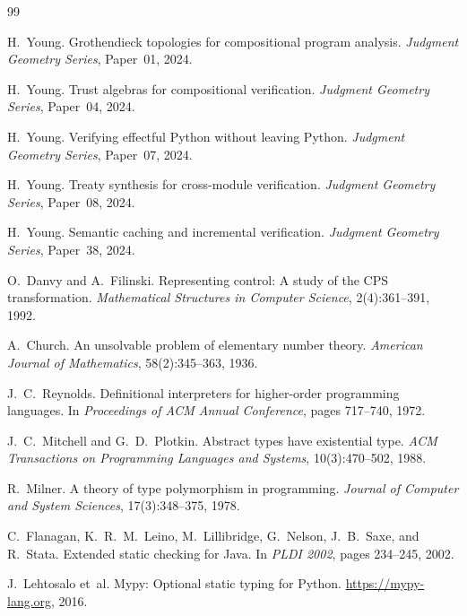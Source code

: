 \documentclass[11pt]{article}
\begin{document}
\begin{thebibliography}{99}

H.~Young.
\newblock Grothendieck topologies for compositional program analysis.
\newblock \textit{Judgment Geometry Series}, Paper~01, 2024.

H.~Young.
\newblock Trust algebras for compositional verification.
\newblock \textit{Judgment Geometry Series}, Paper~04, 2024.

H.~Young.
\newblock Verifying effectful Python without leaving Python.
\newblock \textit{Judgment Geometry Series}, Paper~07, 2024.

H.~Young.
\newblock Treaty synthesis for cross-module verification.
\newblock \textit{Judgment Geometry Series}, Paper~08, 2024.

H.~Young.
\newblock Semantic caching and incremental verification.
\newblock \textit{Judgment Geometry Series}, Paper~38, 2024.

O.~Danvy and A.~Filinski.
\newblock Representing control: A study of the CPS transformation.
\newblock \textit{Mathematical Structures in Computer Science},
  2(4):361--391, 1992.

A.~Church.
\newblock An unsolvable problem of elementary number theory.
\newblock \textit{American Journal of Mathematics}, 58(2):345--363, 1936.

J.~C.~Reynolds.
\newblock Definitional interpreters for higher-order programming languages.
\newblock In \textit{Proceedings of ACM Annual Conference}, pages 717--740,
  1972.

J.~C.~Mitchell and G.~D.~Plotkin.
\newblock Abstract types have existential type.
\newblock \textit{ACM Transactions on Programming Languages and Systems},
  10(3):470--502, 1988.

R.~Milner.
\newblock A theory of type polymorphism in programming.
\newblock \textit{Journal of Computer and System Sciences},
  17(3):348--375, 1978.

C.~Flanagan, K.~R.~M.~Leino, M.~Lillibridge, G.~Nelson, J.~B.~Saxe,
  and R.~Stata.
\newblock Extended static checking for Java.
\newblock In \textit{PLDI 2002}, pages 234--245, 2002.

J.~Lehtosalo et~al.
\newblock Mypy: Optional static typing for Python.
\newblock \url{https://mypy-lang.org}, 2016.


\end{thebibliography}
\end{document}

